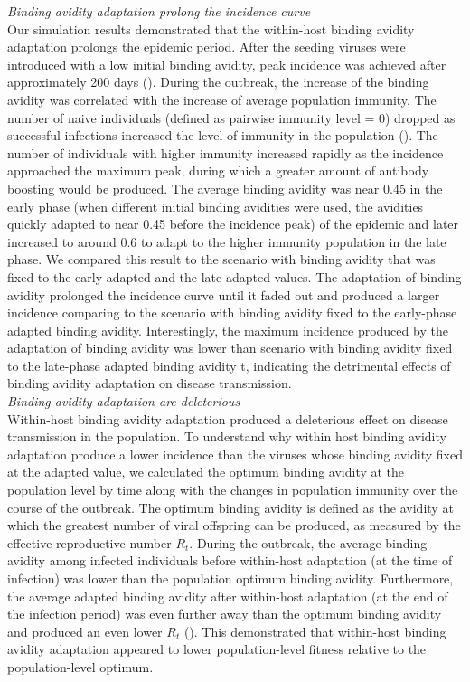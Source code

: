 \documentclass[12pt,a4paper]{article}
\begin{document}
{\it  Binding avidity adaptation prolong the incidence curve } \\
Our simulation results demonstrated that the within-host binding avidity adaptation prolongs the epidemic period. After the seeding viruses were introduced with a low initial binding avidity, peak incidence was achieved after approximately 200 days (). During the outbreak, the increase of the binding avidity was correlated with the increase of average population immunity. The number of naive individuals (defined as pairwise immunity level = 0) dropped as successful infections increased the level of immunity in the population ().  The number of individuals with higher immunity increased rapidly as the incidence approached the maximum peak, during which a greater amount of antibody boosting would be produced. The average binding avidity was near 0.45 in the early phase (when different initial binding avidities were used, the avidities quickly adapted to near 0.45 before the incidence peak) of the epidemic and later increased to around 0.6 to adapt to the higher immunity population in the late phase. We compared this result to the scenario with binding avidity that was fixed to the early adapted and the late adapted values. The adaptation of binding avidity prolonged the incidence curve until it faded out and produced a larger incidence comparing to the scenario with binding avidity fixed to the early-phase adapted binding avidity. Interestingly, the maximum incidence produced by the adaptation of binding avidity was lower than scenario with binding avidity fixed to the late-phase adapted binding avidity t, indicating the detrimental effects of binding avidity adaptation on disease transmission.  \\

{\it  Binding avidity adaptation are deleterious } \\
Within-host binding avidity adaptation produced a deleterious effect on disease transmission in the population. To understand why within host binding avidity adaptation produce a lower incidence than the viruses whose binding avidity fixed at the adapted value, we calculated the optimum binding avidity at the population level by time along with the changes in population immunity over the course of the outbreak. The optimum binding avidity is defined as the avidity at which the greatest number of viral offspring can be produced, as measured by the effective reproductive number $R_{t}$. During the outbreak, the average binding avidity among infected individuals before within-host adaptation (at the time of infection) was lower than the population optimum binding avidity. Furthermore, the average adapted binding avidity after within-host adaptation (at the end of the infection period) was even further away than the optimum binding avidity and produced an even lower $R_{t}$ (). This demonstrated that within-host binding avidity adaptation appeared to lower population-level fitness relative to the population-level optimum. \\
\end{document}
